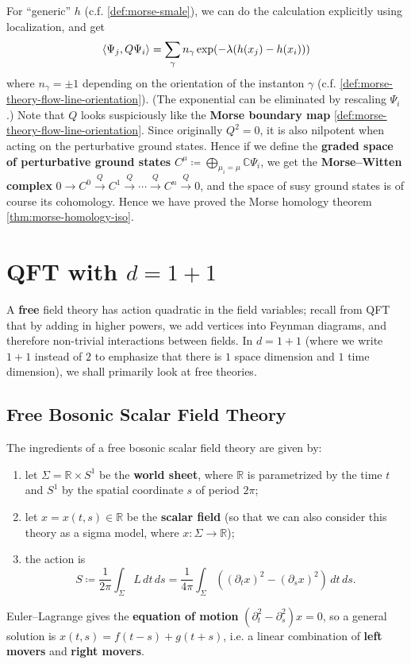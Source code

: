 \documentclass{report}
\theoremstyle{plain}
\theoremstyle{definition}
\theoremstyle{remark}
\newcommand{\di}{\partial}
\newcommand{\bC}{\mathbb{C}}
\newcommand{\bR}{\mathbb{R}}
\begin{document}
For ``generic'' $h$ (c.f. \ref{def:morse-smale}), we can do the
calculation explicitly using localization, and get
\[ \braket{\Psi_j, Q\Psi_i} = \sum_\gamma n_\gamma \exp(-\lambda(h(x_j) - h(x_i))) \]
where $n_\gamma = \pm 1$ depending on the orientation of the instanton
$\gamma$ (c.f. \ref{def:morse-theory-flow-line-orientation}). (The
exponential can be eliminated by rescaling $\Psi_i$.) Note that $Q$
looks suspiciously like the {\bf Morse boundary map}
\ref{def:morse-theory-flow-line-orientation}. Since originally $Q^2 =
0$, it is also nilpotent when acting on the perturbative ground
states. Hence if we define the {\bf graded space of perturbative
  ground states} $C^\mu \coloneqq \bigoplus_{\mu_i=\mu} \bC\Psi_i$, we
get the {\bf Morse--Witten complex} $0 \to C^0 \xrightarrow{Q} C^1
\xrightarrow{Q} \cdots \xrightarrow{Q} C^n \xrightarrow{Q} 0$, and the
space of susy ground states is of course its cohomology. Hence we have
proved the Morse homology theorem \ref{thm:morse-homology-iso}.

\section{QFT with \texorpdfstring{$d=1+1$}{d=1+1}}

A {\bf free} field theory has action quadratic in the field variables;
recall from QFT that by adding in higher powers, we add vertices into
Feynman diagrams, and therefore non-trivial interactions between
fields. In $d=1+1$ (where we write $1+1$ instead of $2$ to emphasize
that there is $1$ space dimension and $1$ time dimension), we shall
primarily look at free theories.

\subsection{Free Bosonic Scalar Field Theory}

The ingredients of a free bosonic scalar field theory are given by:
\begin{enumerate}
\item let $\Sigma = \bR \times S^1$ be the {\bf world sheet}, where
  $\bR$ is parametrized by the time $t$ and $S^1$ by the spatial
  coordinate $s$ of period $2\pi$;
\item let $x = x(t, s) \in \bR$ be the {\bf scalar field} (so that we
  can also consider this theory as a sigma model, where $x\colon
  \Sigma \to \bR$);
\item the action is
  \[ S \coloneqq \frac{1}{2\pi} \int_\Sigma L \, dt \, ds = \frac{1}{4\pi} \int_\Sigma \left((\di_t x)^2 - (\di_s x)^2\right) \, dt \, ds. \]
\end{enumerate}
Euler--Lagrange gives the {\bf equation of motion} $(\di_t^2 -
\di_s^2)x = 0$, so a general solution is $x(t, s) = f(t - s) + g(t +
s)$, i.e. a linear combination of {\bf left movers} and {\bf right
  movers}.
\end{document}
